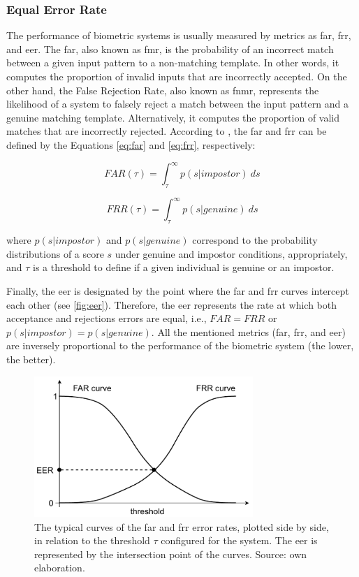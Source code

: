 \subsubsection{Equal Error Rate}

The performance of biometric systems is usually measured by metrics as \acf{far}, \acf{frr}, and \acf{eer}. The \acl{far}, also known as \acf{fmr}, is the probability of an incorrect match between a given input pattern to a non-matching template. In other words, it computes the proportion of invalid inputs that are incorrectly accepted. On the other hand, the False Rejection Rate, also known as \acf{fnmr}, represents the likelihood of a system to falsely reject a match between the input pattern and a genuine matching template. Alternatively, it computes the proportion of valid matches that are incorrectly rejected. According to \cite{ross2006handbook}, the \acs{far} and \acs{frr} can be defined by the Equations \ref{eq:far} and \ref{eq:frr}, respectively:

\begin{equation}
\label{eq:far}
FAR(\tau) = \int_{\tau}^{\infty} p(s|impostor)\ ds
\end{equation}

\begin{equation}
\label{eq:frr}
FRR(\tau) = \int_{\tau}^{\infty} p(s|genuine)\ ds
\end{equation}

\noindent
where $p(s|impostor)$ and $p(s|genuine)$ correspond to the probability distributions of a score $s$ under genuine and impostor conditions, appropriately, and $\tau$ is a threshold to define if a given individual is genuine or an impostor.

Finally, the \acs{eer} is designated by the point where the \acs{far} and \acs{frr} curves intercept each other (see \autoref{fig:eer}). Therefore, the \acs{eer} represents the rate at which both acceptance and rejections errors are equal, i.e., $FAR = FRR$ or $p(s|impostor) = p(s|genuine)$. All the mentioned metrics (\acs{far}, \acs{frr}, and \acs{eer}) are inversely proportional to the performance of the biometric system (the lower, the better).

\begin{figure}[tb]
\centering
\includegraphics[height=2.1in]{images/metrics/EER.pdf}
\caption{The typical curves of the \acs{far} and \acs{frr} error rates, plotted side by side, in relation to the threshold $\tau$ configured for the system. The \acs{eer} is represented by the intersection point of the curves. Source: own elaboration.}
\label{fig:eer}
\end{figure}

